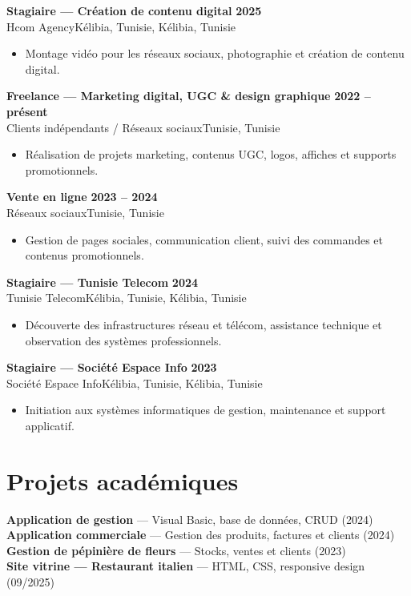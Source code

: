 \documentclass[a4paper,10pt]{article}
\newcommand{\cventry}[4]{%
  \textbf{#1} \hfill \textbf{#4}\\[1pt]
  #2{\ifx\relax#3\relax\else, #3\fi}\par\vspace{1.5pt}}
\begin{document}
\cventry{Stagiaire — Création de contenu digital}{Hcom Agency}{Kélibia, Tunisie}{2025}
\begin{itemize}
  \item Montage vidéo pour les réseaux sociaux, photographie et création de contenu digital.
\end{itemize}

\cventry{Freelance — Marketing digital, UGC \& design graphique}{Clients indépendants / Réseaux sociaux}{Tunisie}{2022 -- présent}
\begin{itemize}
  \item Réalisation de projets marketing, contenus UGC, logos, affiches et supports promotionnels.
\end{itemize}

\cventry{Vente en ligne}{Réseaux sociaux}{Tunisie}{2023 -- 2024}
\begin{itemize}
  \item Gestion de pages sociales, communication client, suivi des commandes et contenus promotionnels.
\end{itemize}

\cventry{Stagiaire — Tunisie Telecom}{Tunisie Telecom}{Kélibia, Tunisie}{2024}
\begin{itemize}
  \item Découverte des infrastructures réseau et télécom, assistance technique et observation des systèmes professionnels.
\end{itemize}

\cventry{Stagiaire — Société Espace Info}{Société Espace Info}{Kélibia, Tunisie}{2023}
\begin{itemize}
  \item Initiation aux systèmes informatiques de gestion, maintenance et support applicatif.
\end{itemize}

\section{Projets académiques}
\textbf{Application de gestion} — Visual Basic, base de données, CRUD (2024)\\[1pt]
\textbf{Application commerciale} — Gestion des produits, factures et clients (2024)\\[1pt]
\textbf{Gestion de pépinière de fleurs} — Stocks, ventes et clients (2023)\\[1pt]
\textbf{Site vitrine — Restaurant italien} — HTML, CSS, responsive design (09/2025)
\end{document}
